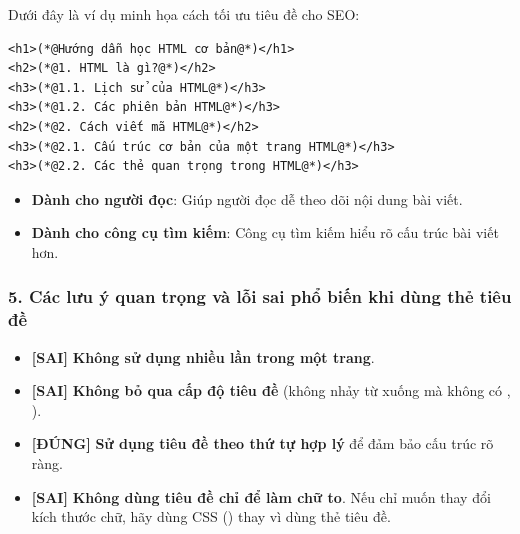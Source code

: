Dưới đây là ví dụ minh họa cách tối ưu tiêu đề cho SEO:

\begin{codeWindow}
\begin{lstlisting}[language=HTML5]
<h1>(*@Hướng dẫn học HTML cơ bản@*)</h1>
<h2>(*@1. HTML là gì?@*)</h2>
<h3>(*@1.1. Lịch sử của HTML@*)</h3>
<h3>(*@1.2. Các phiên bản HTML@*)</h3>
<h2>(*@2. Cách viết mã HTML@*)</h2>
<h3>(*@2.1. Cấu trúc cơ bản của một trang HTML@*)</h3>
<h3>(*@2.2. Các thẻ quan trọng trong HTML@*)</h3>
\end{lstlisting}
\end{codeWindow}

\begin{tipBox}
\begin{itemize}[leftmargin=1.5em, itemsep=2pt, parsep=0pt]
    \item \textbf{Dành cho người đọc}: Giúp người đọc dễ theo dõi nội dung bài viết.
    \item \textbf{Dành cho công cụ tìm kiếm}: Công cụ tìm kiếm hiểu rõ cấu trúc bài viết hơn.
\end{itemize}
\end{tipBox}

\subsubsection{5. Các lưu ý quan trọng và lỗi sai phổ biến khi dùng thẻ tiêu đề}

\begin{warnBox}
\begin{itemize}[leftmargin=1.5em, itemsep=3pt, parsep=0pt]
    \item \textcolor{codeKeyword}{\textbf{[SAI]}} \textbf{Không sử dụng  nhiều lần trong một trang}.
    \item \textcolor{codeKeyword}{\textbf{[SAI]}} \textbf{Không bỏ qua cấp độ tiêu đề} (không nhảy từ  xuống  mà không có , ).
    \item \textcolor{codeString}{\textbf{[ĐÚNG]}} \textbf{Sử dụng tiêu đề theo thứ tự hợp lý} để đảm bảo cấu trúc rõ ràng.
    \item \textcolor{codeKeyword}{\textbf{[SAI]}} \textbf{Không dùng tiêu đề chỉ để làm chữ to}. Nếu chỉ muốn thay đổi kích thước chữ, hãy dùng CSS () thay vì dùng thẻ tiêu đề.
\end{itemize}
\end{warnBox}

